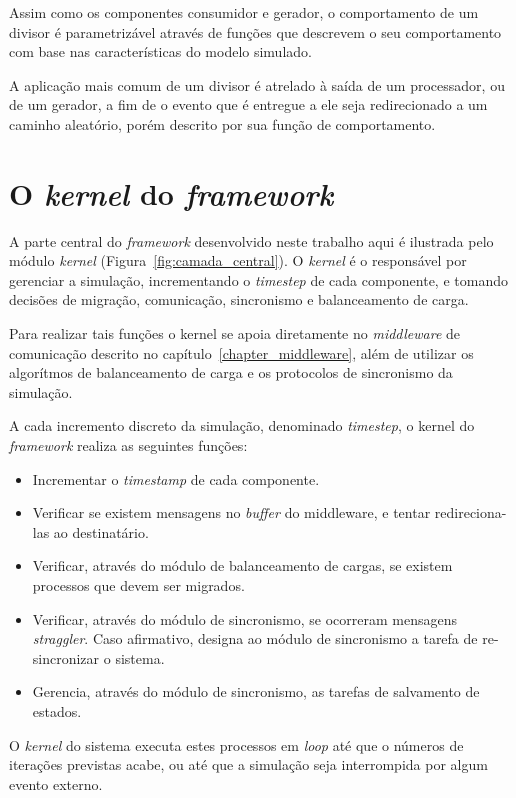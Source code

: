 Assim como os componentes consumidor e gerador, o comportamento de um divisor é parametrizável através de funções que descrevem o seu comportamento com base nas características do modelo simulado.

A aplicação mais comum de um divisor é atrelado à saída de um processador, ou de um gerador, a fim de o evento que é entregue a ele seja redirecionado a um caminho aleatório, porém descrito por sua função de comportamento.

\section{O \textit{kernel} do \textit{framework}}

A parte central do \textit{framework} desenvolvido neste trabalho aqui é ilustrada pelo módulo \textit{kernel} (Figura~\ref{fig:camada_central}). O \textit{kernel} é o responsável por gerenciar a simulação, incrementando o \textit{timestep} de cada componente, e tomando decisões de migração, comunicação, sincronismo e balanceamento de carga.

Para realizar tais funções o kernel se apoia diretamente no \textit{middleware} de comunicação descrito no capítulo~\ref{chapter_middleware}, além de utilizar os algorítmos de balanceamento de carga e os protocolos de sincronismo da simulação.

A cada incremento discreto da simulação, denominado \textit{timestep}, o kernel do \textit{framework} realiza as seguintes funções:

\begin{itemize}
\item Incrementar o \textit{timestamp} de cada componente.
\item Verificar se existem mensagens no \textit{buffer} do middleware, e tentar redireciona-las ao destinatário.
\item Verificar, através do módulo de balanceamento de cargas, se existem processos que devem ser migrados.
\item Verificar, através do módulo de sincronismo, se ocorreram mensagens \textit{straggler}. Caso afirmativo, designa ao módulo de sincronismo a tarefa de re-sincronizar o sistema.
\item Gerencia, através do módulo de sincronismo, as tarefas de salvamento de estados.
\end{itemize}

O \textit{kernel} do sistema executa estes processos em \textit{loop} até que o números de iterações previstas acabe, ou até que a simulação seja interrompida por algum evento externo.

